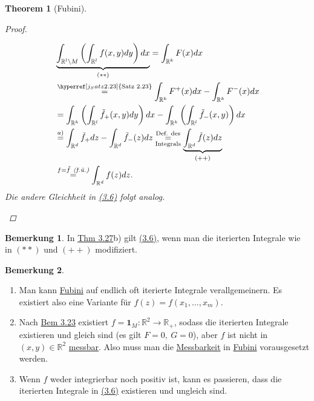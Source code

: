 \documentclass[a4paper]{report}
\newcommand{\doubleOne}{\textbf{1}}
\newcommand{\R}{\mathbb{R}}
\newcommand{\jlabel}[1]{\label{j_#1}}
\newcommand{\jshortlink}[1]{\jhyperref{#1}{\text{#1}}}
\newcommand{\jhyperref}[2]{\hyperref[j_#1]{#2}}
\newcommand{\jlink}[1]{\jhyperref{#1}{#1}}
\newcommand{\fu}{\text{\textit{(f.ü.)}}}
\newcommand{\jabb}[3]{ #1: #2 \rightarrow #3 }
\newcommand{\jspacesmall}{\vspace{4pt}}
\theoremstyle{plain}
\newtheorem{thm}{Theorem}[chapter]
\theoremstyle{definition}
\newtheorem{bem}[thm]{Bemerkung}
\newtheorem*{bem*}{Bemerkung}
\begin{document}
{{{{\begin{thm}[Fubini]
\begin{proof}
\begin{enumerate}
\begin{displaymath}
                    \begin{split}
                        &\underbrace{\int_{\R^l\backslash M} \left(\int_{\R^l} f(x,y)dy \right)dx}_{(**)} = \int_{\R^k} F(x) dx\\
                        &\overset{\jshortlink{Satz 2.23}}{=} \int_{\R^k} F^+(x) dx - \int_{\R^k} F^-(x)dx\\
                        &= \int_{\R^k} \left(\int_{\R^l} \tilde{f}_+(x,y)dy \right)dx - \int_{\R^k}\left(\int_{\R^l} \tilde{f}_-(x,y) \right)dx\\
                        &\overset{a)}{=} \int_{\R^d} \tilde{f}_+dz - \int_{\R^d} \tilde{f}_-(z)dz \underset{\text{Integrals}}{\overset{\text{Def. des}}{=}} \underbrace{\int_{\R^d} \tilde{f}(z)dz}_{(++)}\\
                        &\overset{f=\tilde{f}\ \fu}{=} \int_{\R^d}f(z)dz.
                    \end{split}
                \end{displaymath}
                Die andere Gleichheit in \jlink{(3.6)} folgt analog.
        \end{enumerate}
    \end{proof}
\end{thm}

\begin{bem*}
    In \jlink{Thm 3.27}b) gilt \jlink{(3.6)}, wenn man die iterierten Integrale wie in $(**)$ und $(++)$ modifiziert.
\end{bem*}

\jlabel{Bem 3.28}
\begin{bem}
    \begin{enumerate}
        \item Man kann \jlink{Fubini} auf endlich oft iterierte Integrale verallgemeinern. Es existiert also eine Variante für $f(z) = f(x_1, \dots, x_m)$.
        \item 
            Nach \jlink{Bem 3.23} existiert $\jabb{f = \doubleOne_M}{\R^2}{\R_+}$, sodass die iterierten Integrale existieren und gleich sind (es gilt $F=0,\ G=0$), aber $f$ ist nicht in $(x,y)\in\R^2$ \jlink{messbar}. Also muss man die  \jhyperref{messbar}{Messbarkeit} in \jlink{Fubini} vorausgesetzt werden.
        \item 
            Wenn $f$ weder integrierbar noch positiv ist, kann es passieren, dass die iterierten Integrale in \jlink{(3.6)} existieren und ungleich sind.
        
            \jspacesmall
            

\end{enumerate}
\end{bem}}}}}
\end{document}
